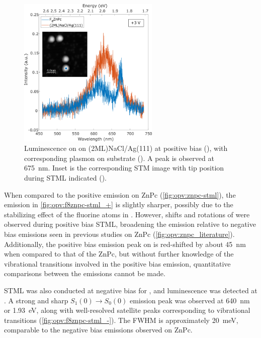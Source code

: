 \begin{figure} [H]
    \centering
        \includegraphics[width=0.6\textwidth]{pictures/f8znpc_+ve_emission_inset.png}
    \caption{Luminescence on  on (2ML)NaCl/Ag(111) at positive bias (), with corresponding plasmon on substrate (). A peak is observed at \SI{675}{nm}. Inset is the corresponding STM image with tip position during STML indicated (). }
    \label{fig:opv:f8znpc-stml_+}
\end{figure}

When compared to the positive emission on ZnPc (\autoref{fig:opv:znpc-stml}), the emission in \autoref{fig:opv:f8znpc-stml_+} is slightly sharper, possibly due to the stabilizing effect of the fluorine atoms in . However, shifts and rotations of  were observed during positive bias \ac{STML}, broadening the emission relative to negative bias emissions seen in previous studies on ZnPc (\autoref{fig:opv:znpc_literature}). Additionally, the positive bias emission peak on  is red-shifted by about \SI{45}{nm} when compared to that of the ZnPc, but without further knowledge of the vibrational transitions involved in the positive bias emission, quantitative comparisons between the emissions cannot be made.

\ac{STML} was also conducted at negative bias for , and luminescence was detected at . A strong and sharp $S_1(0) \rightarrow S_0(0)$ emission peak was observed at \SI{640}{nm} or \SI{1.93}{eV}, along with well-resolved satellite peaks corresponding to vibrational transitions (\autoref{fig:opv:f8znpc-stml_-}). The \ac{FWHM} is approximately \SI{20}{meV}, comparable to the negative bias emissions observed on ZnPc. 


